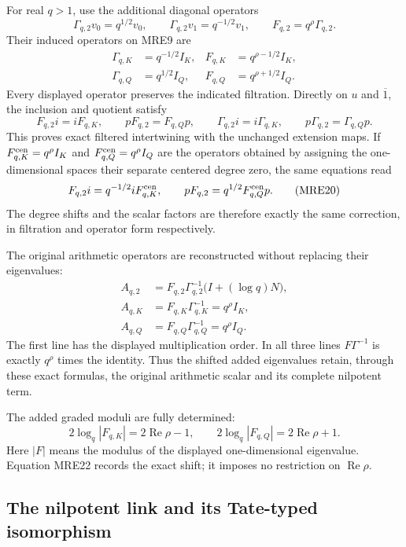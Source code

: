 \documentclass[11pt,a4paper]{article}
\begin{document}
For real \(q>1\), use the additional diagonal operators
\[
 \Gamma_{q,2}v_0=q^{1/2}v_0,\qquad
 \Gamma_{q,2}v_1=q^{-1/2}v_1,\qquad
 F_{q,2}=q^\rho\Gamma_{q,2}.
 \tag{MRE17}
\]
Their induced operators on MRE9 are
\[
 \begin{aligned}
 \Gamma_{q,K}&=q^{-1/2}I_K,&
 F_{q,K}&=q^{\rho-1/2}I_K,\\
 \Gamma_{q,Q}&=q^{1/2}I_Q,&
 F_{q,Q}&=q^{\rho+1/2}I_Q.
 \end{aligned}
 \tag{MRE18}
\]
Every displayed operator preserves the indicated filtration. Directly on
\(u\) and \(\overline{1}\), the inclusion and quotient satisfy
\[
 F_{q,2}i=iF_{q,K},\qquad pF_{q,2}=F_{q,Q}p,
 \qquad
 \Gamma_{q,2}i=i\Gamma_{q,K},\qquad
 p\Gamma_{q,2}=\Gamma_{q,Q}p.
 \tag{MRE19}
\]
This proves exact filtered intertwining with the unchanged extension maps.
If \(F_{q,K}^{\rm cen}=q^\rho I_K\) and
\(F_{q,Q}^{\rm cen}=q^\rho I_Q\) are the operators obtained by assigning
the one-dimensional spaces their separate centered degree zero, the
same equations read
\[
 F_{q,2}i=q^{-1/2}iF_{q,K}^{\rm cen},\qquad
 pF_{q,2}=q^{1/2}F_{q,Q}^{\rm cen}p.
 \tag{MRE20}
\]
The degree shifts and the scalar factors are therefore exactly the same
correction, in filtration and operator form respectively.

The original arithmetic operators are reconstructed without replacing
their eigenvalues:
\[
 \begin{aligned}
 A_{q,2}&=F_{q,2}\Gamma_{q,2}^{-1}
                       \bigl(I+(\log q)N\bigr),\\
 A_{q,K}&=F_{q,K}\Gamma_{q,K}^{-1}=q^\rho I_K,\\
 A_{q,Q}&=F_{q,Q}\Gamma_{q,Q}^{-1}=q^\rho I_Q.
 \end{aligned}
 \tag{MRE21}
\]
The first line has the displayed multiplication order. In all three
lines \(F\Gamma^{-1}\) is exactly \(q^\rho\) times the identity.
Thus the shifted added eigenvalues retain, through these exact formulas,
the original arithmetic scalar and its complete nilpotent term.

The added graded moduli are fully determined:
\[
 2\log_q|F_{q,K}|=2\operatorname{Re}\rho-1,\qquad
 2\log_q|F_{q,Q}|=2\operatorname{Re}\rho+1.
 \tag{MRE22}
\]
Here \(|F|\) means the modulus of the displayed one-dimensional
eigenvalue. Equation MRE22 records the exact shift; it imposes no
restriction on \(\operatorname{Re}\rho\).

\subsection{The nilpotent link and its Tate-typed isomorphism}
\end{document}
